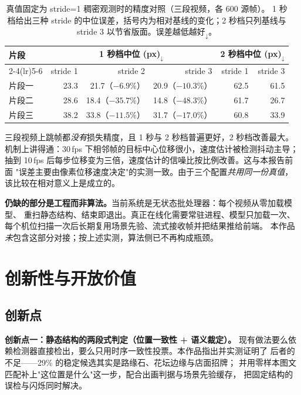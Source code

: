 \documentclass[11pt,a4paper]{ctexart}
\newcommand{\dn}{$_{\downarrow}$}
\begin{document}
\begin{table}[t]\centering\small
\caption{真值固定为 stride=1 稠密观测时的精度对照（三段视频，各 600 源帧）。
1 秒档给出三种 stride 的中位误差，括号内为相对基线的变化；2 秒档只列基线与
stride 3 以节省版面。误差越低越好\dn。}
\label{tab:stride-acc}
\begin{tabular}{lrrrrr}
\toprule
片段 & \multicolumn{3}{c}{1 秒档中位 (px)\dn} & \multicolumn{2}{c}{2 秒档中位 (px)\dn} \\
\cmidrule(lr){2-4}\cmidrule(lr){5-6}
 & stride 1 & stride 2 & stride 3 & stride 1 & stride 3 \\
\midrule
片段一 & 23.3 & 21.7（$-6.9\%$） & 20.9（$-10.3\%$） & 62.5 & 61.5 \\
片段二 & 28.6 & 18.4（$-35.7\%$） & 14.8（$-48.3\%$） & 61.7 & 26.7 \\
片段三 & 38.2 & 33.8（$-11.5\%$） & 31.7（$-17.0\%$） & 60.8 & 33.9 \\
\bottomrule
\end{tabular}
\end{table}

三段视频上跳帧都\emph{没有}损失精度，且 1 秒与 2 秒档普遍更好，2 秒档改善最大。
机制上讲得通：30\,fps 下相邻帧的目标中心位移很小，速度估计被检测抖动主导；
抽到 10\,fps 后每步位移变为三倍，速度估计的信噪比按比例改善。这与本报告前面
"误差主要由像素位移速度决定"的实测一致。由于三个配置\emph{共用同一份真值}，
该比较在相对意义上是成立的。

\textbf{仍缺的部分是工程而非算法。}当前系统是无状态批处理器：每个视频从零加载模型、
重扫静态结构、结束即退出。真正在线化需要常驻进程、模型只加载一次、
每个机位扫描一次后长期复用场景先验、流式接收帧并把结果推给前端。
本作品\emph{未}包含这部分对接；按上述实测，算法侧已不再构成瓶颈。

\section{创新性与开放价值}
\label{sec:innov}

\subsection{创新点}

\textbf{创新点一：静态结构的两段式判定（位置一致性 + 语义裁定）。}
现有做法要么依赖检测器直接检出，要么只用时序一致性投票。本作品指出并实测证明了
后者的不足——29\% 的稳定候选其实是路缘石、花坛边缘与店面招牌；
并用零样本图文匹配补上"这位置是什么"这一步，配合出画判据与场景先验缓存，
把固定结构的误检与闪烁同时解决。
\end{document}
